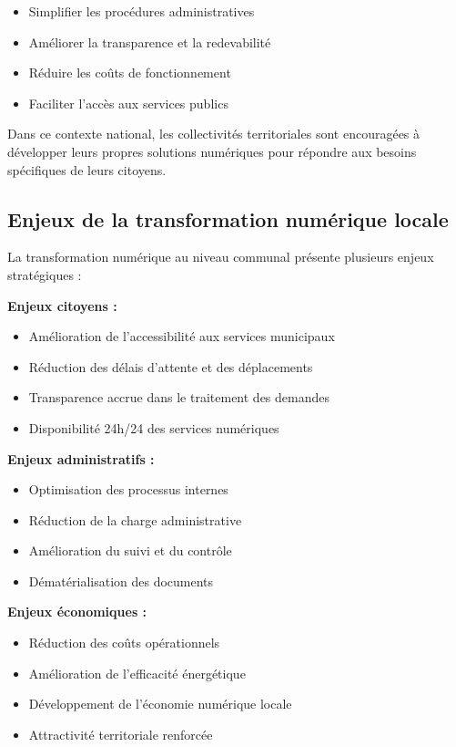 \begin{itemize}
\item Simplifier les procédures administratives
\item Améliorer la transparence et la redevabilité
\item Réduire les coûts de fonctionnement
\item Faciliter l'accès aux services publics
\end{itemize}

Dans ce contexte national, les collectivités territoriales sont encouragées à développer leurs propres solutions numériques pour répondre aux besoins spécifiques de leurs citoyens.

\subsection{Enjeux de la transformation numérique locale}

La transformation numérique au niveau communal présente plusieurs enjeux stratégiques :

\textbf{Enjeux citoyens :}
\begin{itemize}
\item Amélioration de l'accessibilité aux services municipaux
\item Réduction des délais d'attente et des déplacements
\item Transparence accrue dans le traitement des demandes
\item Disponibilité 24h/24 des services numériques
\end{itemize}

\textbf{Enjeux administratifs :}
\begin{itemize}
\item Optimisation des processus internes
\item Réduction de la charge administrative
\item Amélioration du suivi et du contrôle
\item Dématérialisation des documents
\end{itemize}

\textbf{Enjeux économiques :}
\begin{itemize}
\item Réduction des coûts opérationnels
\item Amélioration de l'efficacité énergétique
\item Développement de l'économie numérique locale
\item Attractivité territoriale renforcée
\end{itemize}

